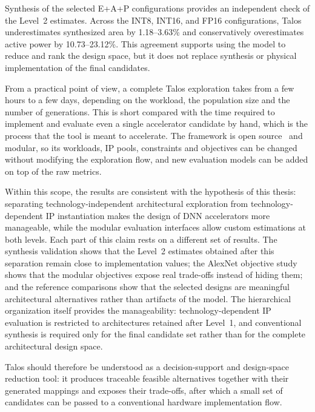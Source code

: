 Synthesis of the selected E+A+P configurations provides an independent
check of the Level~2 estimates. Across the INT8, INT16, and FP16
configurations, Talos underestimates synthesized area by 1.18--3.63\%
and conservatively overestimates active power by 10.73--23.12\%. This
agreement supports using the model to reduce and rank the design space,
but it does not replace synthesis or physical implementation of the
final candidates.

From a practical point of view, a complete Talos exploration takes
from a few hours to a few days, depending on the workload, the
population size and the number of generations. This is short compared
with the time required to implement and evaluate even a single
accelerator candidate by hand, which is the process that the tool is
meant to accelerate. The framework is open source~\cite{talos_repo} and
modular, so its
workloads, IP pools, constraints and objectives can be changed without
modifying the exploration flow, and new evaluation models can be
added on top of the raw metrics.

Within this scope, the results are consistent with the hypothesis of
this thesis: separating technology-independent architectural
exploration from technology-dependent IP instantiation makes the
design of DNN accelerators more manageable, while the modular
evaluation interfaces allow custom estimations at both levels. Each
part of this claim rests on a different set of results. The synthesis
validation shows that the Level~2 estimates obtained after this
separation remain close to implementation values; the AlexNet
objective study shows that the modular objectives expose real
trade-offs instead of hiding them; and the reference comparisons show
that the selected designs are meaningful architectural alternatives
rather than artifacts of the model. The hierarchical organization
itself provides the manageability: technology-dependent IP evaluation
is restricted to architectures retained after Level~1, and
conventional synthesis is required only for the final candidate set
rather than for the complete architectural design space.

Talos should therefore be understood as a decision-support and 
design-space reduction tool: it produces
traceable feasible alternatives together with their generated
mappings and exposes their trade-offs, after which a small set of
candidates can be passed to a conventional hardware implementation
flow.

